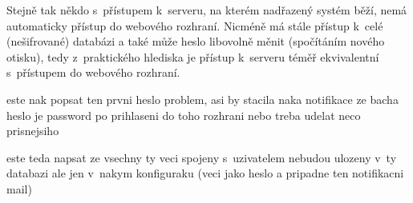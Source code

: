 Stejně tak někdo s~přístupem k~serveru, na kterém nadřazený systém běží, nemá automaticky přístup do webového rozhraní. Nicméně má stále přístup k~celé (nešifrované) databázi a také může heslo libovolně měnit (spočítáním nového otisku), tedy z~praktického hlediska je přístup k~serveru téměř ekvivalentní s~přístupem do webového rozhraní.

este nak popsat ten prvni heslo problem, asi by stacila naka notifikace ze bacha heslo je password po prihlaseni do toho rozhrani nebo treba udelat neco prisnejsiho

este teda napsat ze vsechny ty veci spojeny s~uzivatelem nebudou ulozeny v~ty databazi ale jen v~nakym konfiguraku (veci jako heslo a pripadne ten notifikacni mail)
